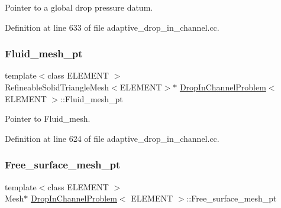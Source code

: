 Pointer to a global drop pressure datum. 



Definition at line 633 of file adaptive\+\_\+drop\+\_\+in\+\_\+channel.\+cc.

\mbox{\label{classDropInChannelProblem_a1f16a75afe9aad09be325d409a4a1b0d}} 
\subsubsection{\texorpdfstring{Fluid\+\_\+mesh\+\_\+pt}{Fluid\_mesh\_pt}}
{\footnotesize\ttfamily template$<$class E\+L\+E\+M\+E\+NT $>$ \\
Refineable\+Solid\+Triangle\+Mesh$<$E\+L\+E\+M\+E\+NT$>$$\ast$ \hyperlink{classDropInChannelProblem}{Drop\+In\+Channel\+Problem}$<$ E\+L\+E\+M\+E\+NT $>$\+::Fluid\+\_\+mesh\+\_\+pt\hspace{0.3cm}{\ttfamily [private]}}



Pointer to Fluid\+\_\+mesh. 



Definition at line 624 of file adaptive\+\_\+drop\+\_\+in\+\_\+channel.\+cc.

\mbox{\label{classDropInChannelProblem_a6de0bac4bc483d500aa215a59bbf25bc}} 
\subsubsection{\texorpdfstring{Free\+\_\+surface\+\_\+mesh\+\_\+pt}{Free\_surface\_mesh\_pt}}
{\footnotesize\ttfamily template$<$class E\+L\+E\+M\+E\+NT $>$ \\
Mesh$\ast$ \hyperlink{classDropInChannelProblem}{Drop\+In\+Channel\+Problem}$<$ E\+L\+E\+M\+E\+NT $>$\+::Free\+\_\+surface\+\_\+mesh\+\_\+pt\hspace{0.3cm}{\ttfamily [private]}}



